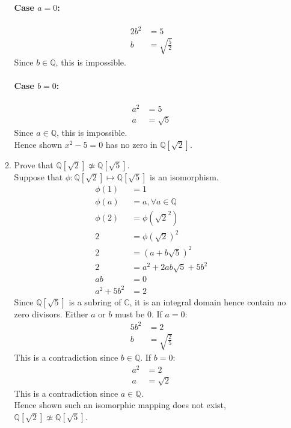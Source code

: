 \documentclass[12pt]{article}
\begin{document}
\begin{enumerate}
\begin{enumerate}
			\paragraph{Case $a=0$:}
				\begin{align*}
					2b^2&=5\\
					b&=\sqrt{\frac{5}{2}}
				\end{align*}
				Since $b \in \mathbb{Q}$, this is impossible.
			\paragraph{Case $b=0$:}
				\begin{align*}
					a^2&=5\\
					a&=\sqrt{5}
				\end{align*}
				Since $a \in \mathbb{Q}$, this is impossible.\\
			Hence shown $x^2 - 5 = 0$ has no zero in $\mathbb{Q}[\sqrt{2}]$.

			\item Prove that $\mathbb{Q}[\sqrt{2}] \not\simeq \mathbb{Q}[\sqrt{5}]$.\\
				Suppose that $\phi : \mathbb{Q}[\sqrt{2}] \mapsto \mathbb{Q}[\sqrt{5}]$
				is an isomorphism. 
				\begin{align*}
				\phi(1) &= 1\\
				\phi(a) &= a, \forall a\in\mathbb{Q}\\
				\phi(2) &= \phi(\sqrt{2}^2)\\
							2 &= \phi(\sqrt{2})^2\\
							2 &= (a+b\sqrt{5})^2\\
							2 &= a^2 + 2ab\sqrt{5} + 5b^2\\
						 ab &= 0\\
		 a^2 + 5b^2 &= 2
				\end{align*}
			Since $\mathbb{Q}[\sqrt{5}]$ is a subring of $\mathbb{C}$, it is an
				integral domain hence contain no zero divisors. Either $a$ or $b$ must
				be $0$. If $a=0$:
				\begin{align*}
					5b^2 &= 2\\
					b &= \sqrt{\frac{2}{5}}
				\end{align*}
				This is a contradiction since $b \in \mathbb{Q}$. If $b=0$:
				\begin{align*}
					a^2 &= 2\\
					a &= \sqrt{2}
				\end{align*}
				This is a contradiction since $a \in \mathbb{Q}$.\\
				Hence shown such an isomorphic mapping does not exist,
				$\mathbb{Q}[\sqrt{2}] \not\simeq \mathbb{Q}[\sqrt{5}]$.
		\end{enumerate}


\end{enumerate}
\end{document}
